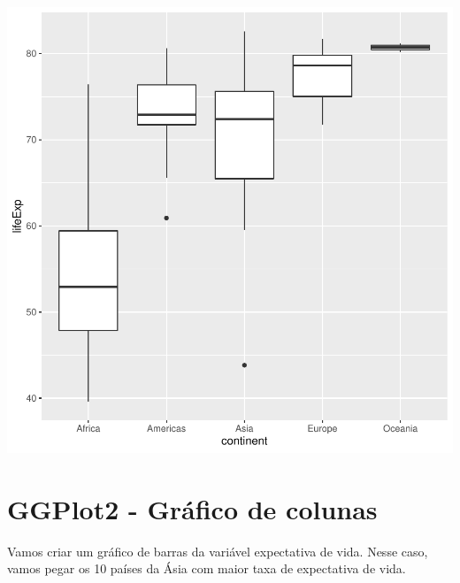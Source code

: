\documentclass[
]{article}
\newenvironment{Shaded}{\begin{snugshade}}{\end{snugshade}}
\newcommand{\DataTypeTok}[1]{\textcolor[rgb]{0.13,0.29,0.53}{#1}}
\newcommand{\DecValTok}[1]{\textcolor[rgb]{0.00,0.00,0.81}{#1}}
\newcommand{\KeywordTok}[1]{\textcolor[rgb]{0.13,0.29,0.53}{\textbf{#1}}}
\newcommand{\NormalTok}[1]{#1}
\newcommand{\OperatorTok}[1]{\textcolor[rgb]{0.81,0.36,0.00}{\textbf{#1}}}
\newcommand{\StringTok}[1]{\textcolor[rgb]{0.31,0.60,0.02}{#1}}
\begin{document}
\begin{center}\includegraphics{arquivo_pdf_files/figure-latex/boxplot2-1} \end{center}

\hypertarget{ggplot2---gruxe1fico-de-colunas}{%
\section{GGPlot2 - Gráfico de
colunas}\label{ggplot2---gruxe1fico-de-colunas}}

Vamos criar um gráfico de barras da variável expectativa de vida. Nesse
caso, vamos pegar os 10 países da Ásia com maior taxa de expectativa de
vida.

\begin{Shaded}
\end{Shaded}
\end{document}
